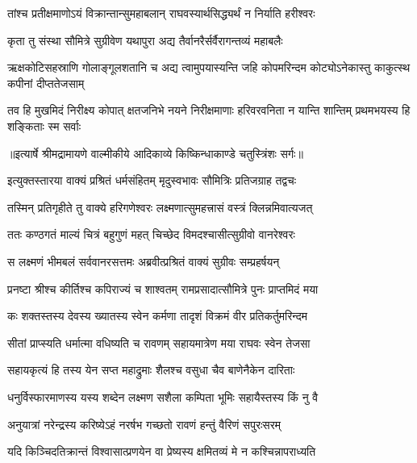 \twolineshloka
{तांश्च प्रतीक्षमाणोऽयं विक्रान्तान्सुमहाबलान्}
{राघवस्यार्थसिद्ध्यर्थं न निर्याति हरीश्वरः} %

\twolineshloka
{कृता तु संस्था सौमित्रे सुग्रीवेण यथापुरा}
{अद्य तैर्वानरैर्सर्वैरागन्तव्यं महाबलैः} %

\threelineshloka
{ऋक्षकोटिसहस्राणि गोलाङ्गूलशतानि च}
{अद्य त्वामुपयास्यन्ति जहि कोपमरिन्दम}
{कोट्योऽनेकास्तु काकुत्स्थ कपीनां दीप्ततेजसाम्} %

\fourlineindentedshloka
{तव हि मुखमिदं निरीक्ष्य कोपात्}
{क्षतजनिभे नयने निरीक्षमाणाः}
{हरिवरवनिता न यान्ति शान्तिम्}
{प्रथमभयस्य हि शङ्किताः स्म सर्वाः} %


{॥इत्यार्षे श्रीमद्रामायणे वाल्मीकीये आदिकाव्ये किष्किन्धाकाण्डे चतुस्त्रिंशः सर्गः॥}


\twolineshloka
{इत्युक्तस्तारया वाक्यं प्रश्रितं धर्मसंहितम्}
{मृदुस्वभावः सौमित्रिः प्रतिजग्राह तद्वचः} %

\twolineshloka
{तस्मिन् प्रतिगृहीते तु वाक्ये हरिगणेश्वरः}
{लक्ष्मणात्सुमहत्त्रासं वस्त्रं क्लिन्नमिवात्यजत्} %

\twolineshloka
{ततः कण्ठगतं माल्यं चित्रं बहुगुणं महत्}
{चिच्छेद विमदश्चासीत्सुग्रीवो वानरेश्वरः} %

\twolineshloka
{स लक्ष्मणं भीमबलं सर्ववानरसत्तमः}
{अब्रवीत्प्रश्रितं वाक्यं सुग्रीवः सम्प्रहर्षयन्} %

\twolineshloka
{प्रनष्टा श्रीश्च कीर्तिश्च कपिराज्यं च शाश्वतम्}
{रामप्रसादात्सौमित्रे पुनः प्राप्तमिदं मया} %

\twolineshloka
{कः शक्तस्तस्य देवस्य ख्यातस्य स्वेन कर्मणा}
{तादृशं विक्रमं वीर प्रतिकर्तुमरिन्दम} %

\twolineshloka
{सीतां प्राप्स्यति धर्मात्मा वधिष्यति च रावणम्}
{सहायमात्रेण मया राघवः स्वेन तेजसा} %

\twolineshloka
{सहायकृत्यं हि तस्य येन सप्त महाद्रुमाः}
{शैलश्च वसुधा चैव बाणेनैकेन दारिताः} %

\twolineshloka
{धनुर्विस्फारमाणस्य यस्य शब्देन लक्ष्मण}
{सशैला कम्पिता भूमिः सहायैस्तस्य किं नु वै} %

\twolineshloka
{अनुयात्रां नरेन्द्रस्य करिष्येऽहं नरर्षभ}
{गच्छतो रावणं हन्तुं वैरिणं सपुरःसरम्} %

\twolineshloka
{यदि किञ्चिदतिक्रान्तं विश्वासात्प्रणयेन वा}
{प्रेष्यस्य क्षमितव्यं मे न कश्चिन्नापराध्यति} %

